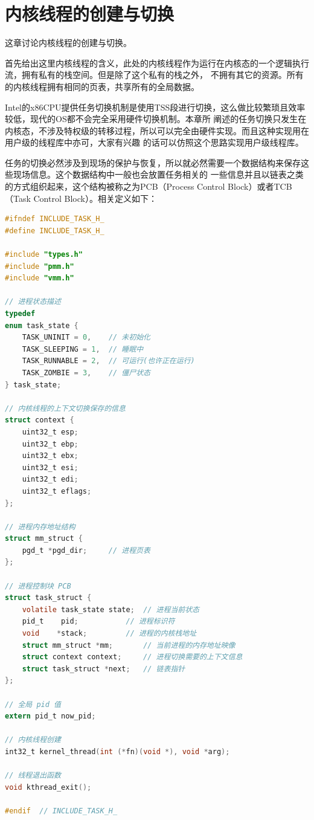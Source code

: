 
\section {内核线程的创建与切换}

\par 这章讨论内核线程的创建与切换。

\par 首先给出这里内核线程的含义，此处的内核线程作为运行在内核态的一个逻辑执行流，拥有私有的栈空间。但是除了这个私有的栈之外，\allowbreak
不拥有其它的资源。所有的内核线程拥有相同的页表，共享所有的全局数据。

\par Intel的x86CPU提供任务切换机制是使用TSS段进行切换，这么做比较繁琐且效率较低，现代的OS都不会完全采用硬件切换机制。本章所\allowbreak
阐述的任务切换只发生在内核态，不涉及特权级的转移过程，所以可以完全由硬件实现。而且这种实现用在用户级的线程库中亦可，大家有兴趣\allowbreak
的话可以仿照这个思路实现用户级线程库。

\par 任务的切换必然涉及到现场的保护与恢复，所以就必然需要一个数据结构来保存这些现场信息。这个数据结构中一般也会放置任务相关的\allowbreak
一些信息并且以链表之类的方式组织起来，这个结构被称之为PCB（Process Control Block）或者TCB（Task Control Block）。相关定义如下：

\begin{lstlisting}[language = C, caption = include/task.h]
#ifndef INCLUDE_TASK_H_
#define INCLUDE_TASK_H_

#include "types.h"
#include "pmm.h"
#include "vmm.h"

// 进程状态描述
typedef
enum task_state {
	TASK_UNINIT = 0, 	// 未初始化
	TASK_SLEEPING = 1, 	// 睡眠中
	TASK_RUNNABLE = 2, 	// 可运行(也许正在运行)
	TASK_ZOMBIE = 3, 	// 僵尸状态
} task_state;

// 内核线程的上下文切换保存的信息
struct context {
	uint32_t esp;
	uint32_t ebp;
	uint32_t ebx;
	uint32_t esi;
	uint32_t edi;
	uint32_t eflags;
};

// 进程内存地址结构
struct mm_struct {
	pgd_t *pgd_dir; 	// 进程页表
};

// 进程控制块 PCB 
struct task_struct {
	volatile task_state state; 	// 进程当前状态
	pid_t 	 pid; 			// 进程标识符
	void  	*stack; 		// 进程的内核栈地址
	struct mm_struct *mm; 		// 当前进程的内存地址映像
	struct context context; 	// 进程切换需要的上下文信息
	struct task_struct *next; 	// 链表指针
};

// 全局 pid 值
extern pid_t now_pid;

// 内核线程创建
int32_t kernel_thread(int (*fn)(void *), void *arg);

// 线程退出函数
void kthread_exit();

#endif 	// INCLUDE_TASK_H_
\end{lstlisting}

